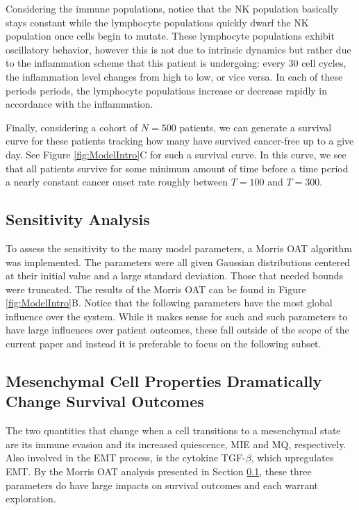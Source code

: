 \documentclass{article}
\begin{document}
Considering the immune populations, notice that the NK population basically stays constant while the lymphocyte populations quickly dwarf the NK population once cells begin to mutate.
These lymphocyte populations exhibit oscillatory behavior, however this is not due to intrinsic dynamics but rather due to the inflammation scheme that this patient is undergoing: every 30 cell cycles, the inflammation level changes from high to low, or vice versa. In each of these periods periods, the lymphocyte populations increase or decrease rapidly in accordance with the inflammation.

Finally, considering a cohort of $N=500$ patients, we can generate a survival curve for these patients tracking how many have survived cancer-free up to a give day.
See Figure \ref{fig:ModelIntro}C for such a survival curve.
In this curve, we see that all patients survive for some minimum amount of time before a time period a nearly constant cancer onset rate roughly between $T = 100$ and $T = 300$.

\subsection{Sensitivity Analysis}\label{SensAnalysis}
To assess the sensitivity to the many model parameters, a Morris OAT algorithm was implemented.
The parameters were all given Gaussian distributions centered at their initial value and a large standard deviation.
Those that needed bounds were truncated.
The results of the Morris OAT can be found in Figure \ref{fig:ModelIntro}B.
Notice that the following parameters have the most global influence over the system.
While it makes sense for such and such parameters to have large influences over patient outcomes, these fall outside of the scope of the current paper and instead it is preferable to focus on the following subset.

\subsection{Mesenchymal Cell Properties Dramatically Change Survival Outcomes}\label{MesPars}
The two quantities that change when a cell transitions to a mesenchymal state are its immune evasion and its increased quiescence, MIE and MQ, respectively.
Also involved in the EMT process, is the cytokine TGF-$\beta$, which upregulates EMT.
By the Morris OAT analysis presented in Section \ref{SensAnalysis}, these three parameters do have large impacts on survival outcomes and each warrant exploration.
\end{document}

